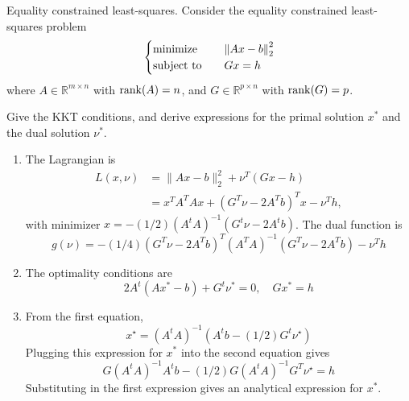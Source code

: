 \begin{problem}[5.27]
    Equality constrained least-squares. Consider the equality constrained least-squares problem\[\begin{cases}
        \operatorname{minimize}\quad &\norm{Ax - b}_2^2\\
        \operatorname{subject\ to}\quad &Gx = h
    \end{cases}\] where $A \in \mathbb{R}^{m \times n}$ with $\rank(A) = n$, and $G \in \mathbb{R}^{p\times n}$ with $\rank(G) = p$.

    Give the KKT conditions, and derive expressions for the primal solution $x^*$ and the dual solution $\nu^*$.
    \Answer \text{}\begin{enumerate}
        \item The Lagrangian is \[\begin{aligned}
            L(x, \nu) &=\|A x-b\|_{2}^{2}+\nu^{T}(G x-h) \\
            &=x^{T} A^{T} A x+\left(G^{T} \nu-2 A^{T} b\right)^{T} x-\nu^{T} h,
        \end{aligned}\] with minimizer $x = -(1 / 2)(A^tA)^{-1}(G^t\nu - 2A^tb)$. The dual function is\[g(\nu)=-(1 / 4)\left(G^{T} \nu-2 A^{T} b\right)^{T}\left(A^{T} A\right)^{-1}\left(G^{T} \nu-2 A^{T} b\right)-\nu^{T} h\]
        \item The optimality conditions are\[2A^t(Ax^* - b) + G^t\nu^* = 0, \quad Gx^* = h\]
        \item From the first equation, \[x^{\star}=\left(A^{t} A\right)^{-1}\left(A^{t} b-(1 / 2) G^{t} \nu^{\star}\right)\] Plugging this expression for $x^*$ into the second equation gives\[G\left(A^{t} A\right)^{-1} A^{t} b-(1 / 2) G\left(A^{t} A\right)^{-1} G^{T} \nu^{\star}=h\] Substituting in the first expression gives an analytical expression for $x^*$.
    \end{enumerate}
\end{problem}

